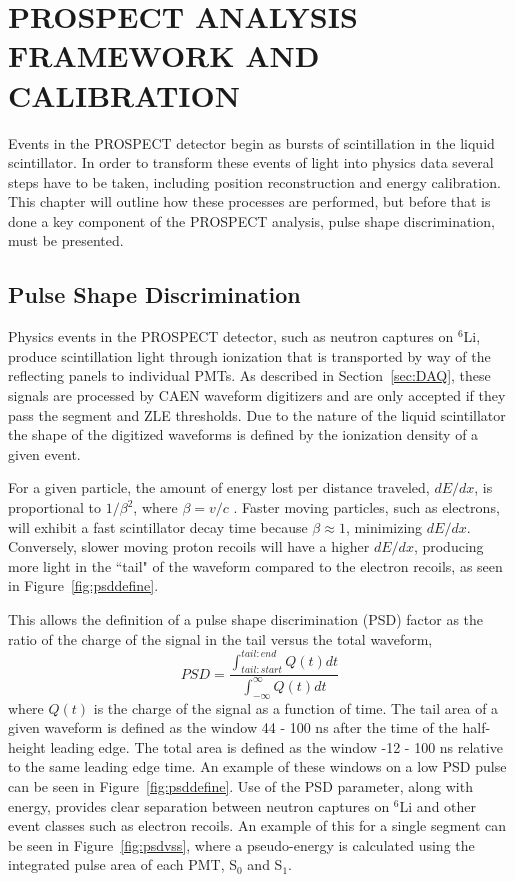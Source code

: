 \chapter{\uppercase{PROSPECT Analysis Framework and Calibration}}

Events in the PROSPECT detector begin as bursts of scintillation in the liquid scintillator. 
In order to transform these events of light into physics data several steps have to be taken, including position reconstruction and energy calibration. 
This chapter will outline how these processes are performed, but before that is done a key component of the PROSPECT analysis, pulse shape discrimination, must be presented.

\section{Pulse Shape Discrimination}

Physics events in the PROSPECT detector, such as neutron captures on $^6$Li, produce scintillation light through ionization that is transported by way of the reflecting panels to individual PMTs. 
As described in Section~\ref{sec:DAQ}, these signals are processed by CAEN waveform digitizers and are only accepted if they pass the segment and ZLE thresholds.
Due to the nature of the liquid scintillator the shape of the digitized waveforms is defined by the ionization density of a given event.

For a given particle, the amount of energy lost per distance traveled, $dE/dx$, is proportional to $1/\beta^2$, where $\beta = v/c$ \cite{PDG}.
Faster moving particles, such as electrons, will exhibit a fast scintillator decay time because $\beta \approx 1$, minimizing $dE/dx$.
Conversely, slower moving proton recoils will have a higher $dE/dx$, producing more light in the ``tail" of the waveform compared to the electron recoils, as seen in Figure~\ref{fig:psddefine}. 

This allows the definition of a pulse shape discrimination (PSD) factor as the ratio of the charge of the signal in the tail versus the total waveform,
\begin{equation}
	PSD =  \frac{\int_{tail:start}^{tail:end}Q(t)dt}{\int_{-\infty}^{\infty}Q(t)dt}
\end{equation}
where $Q(t)$ is the charge of the signal as a function of time.
The tail area of a given waveform is defined as the window 44 - 100 ns after the time of the half-height leading edge. 
The total area is defined as the window -12 - 100 ns relative to the same leading edge time. 
An example of these windows on a low PSD pulse can be seen in Figure~\ref{fig:psddefine}.
Use of the PSD parameter, along with energy, provides clear separation between neutron captures on $^6$Li and other event classes such as electron recoils. 
An example of this for a single segment can be seen in Figure~\ref{fig:psdvss}, where a pseudo-energy is calculated using the integrated pulse area of each PMT, S$_0$ and S$_1$.

